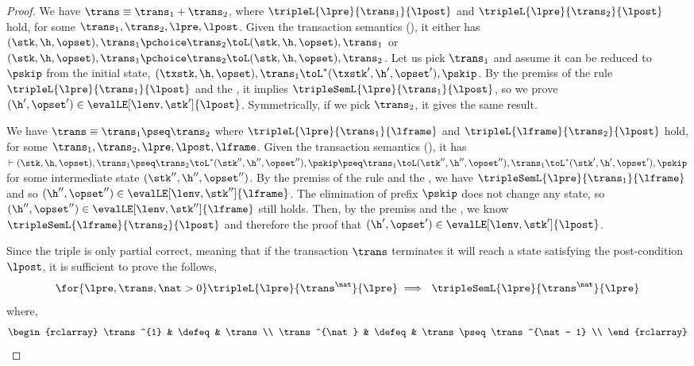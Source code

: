 \begin{proof}
We have  \(\trans \equiv \trans_{1} + \trans_{2} \), where \( \tripleL{\lpre}{\trans_{1}}{\lpost} \) and \( \tripleL{\lpre}{\trans_{2}}{\lpost} \) hold, for some \( \trans_{1}, \trans_{2}, \lpre, \lpost \).
Given the transaction semantics (), it either has \( ( \stk, \h, \opset ), \trans_{1} \pchoice \trans_{2} \toL ( \stk, \h, \opset ), \trans_{1} \) or  \( ( \stk, \h, \opset ), \trans_{1} \pchoice \trans_{2} \toL ( \stk, \h, \opset ), \trans_{2} \).
Let us pick \( \trans_{1} \) and  assume it can be reduced to \( \pskip \) from the initial state, \ie \( ( \txstk, \h, \opset ), \trans_{1}  \toL^{*} ( \txstk', \h', \opset' ), \pskip \).
By the premiss of the rule \( \tripleL{\lpre}{\trans_{1}}{\lpost} \) and the \ih, it implies \( \tripleSemL{\lpre}{\trans_{1}}{\lpost} \), so we prove \( (\h', \opset') \in \evalLE[\lenv, \stk']{\lpost} \).
Symmetrically, if we pick \( \trans_{2} \), it gives the same result.


We have \( \trans \equiv \trans_{1} \pseq \trans_{2} \) where \( \tripleL{\lpre}{\trans_{1}}{\lframe} \) and \( \tripleL{\lframe}{\trans_{2}}{\lpost} \) hold, for some \( \trans_{1}, \trans_{2}, \lpre, \lpost, \lframe \).
Given the transaction semantics (), it has \( \vdash ( \stk, \h, \opset ), \trans_{1} \pseq \trans_{2} \toL^{*} ( \stk'', \h'', \opset'' ), \pskip \pseq \trans_{1} \toL ( \stk'', \h'', \opset'' ), \trans_{1} \toL^{*} ( \stk', \h', \opset' ), \pskip \) for some intermediate state \( (\stk'', \h'', \opset'') \).
By the premiss of the rule and the \ih, we have \( \tripleSemL{\lpre}{\trans_{1}}{\lframe} \) and so \( (\h'', \opset'') \in \evalLE[\lenv, \stk'']{\lframe} \).
The elimination of prefix \( \pskip\) does not change any state, so \( (\h'', \opset'') \in \evalLE[\lenv, \stk'']{\lframe} \) still holds.
Then, by the premiss and the \ih, we know \( \tripleSemL{\lframe}{\trans_{2}}{\lpost} \) and therefore the proof that \( (\h', \opset') \in \evalLE[\lenv, \stk']{\lpost} \).


Since the triple is only partial correct, meaning that if the transaction \( \trans \) terminates it will reach a state satisfying the post-condition \( \lpost \), it is sufficient to prove the follows,
\[
    \for{\lpre, \trans, \nat > 0} \tripleL{\lpre}{\trans^{\nat}}{\lpre} \implies \ \tripleSemL{\lpre}{\trans^{\nat}}{\lpre} 
\]
where,
\[
\begin{rclarray}
    \trans^{1} & \defeq  & \trans \\
    \trans^{\nat} & \defeq  & \trans \pseq \trans^{\nat - 1} \\
\end{rclarray}
\]


\end{proof}
